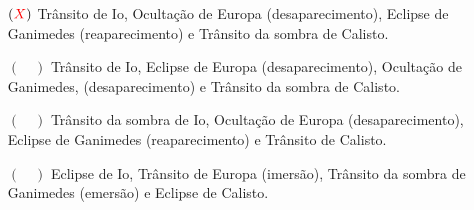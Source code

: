 \documentclass[a4paper, 12pt]{article}
\newcommand{\red}[1]{\textcolor{red}{#1}}
\begin{document}
\begin{flushleft}
\begin{itemize}
\begin{itemize}
                        \begin{itemize}
                            \item[$(\red{X})$] Trânsito de Io, Ocultação de Europa (desaparecimento), Eclipse de Ganimedes (reaparecimento) e Trânsito da sombra de Calisto.
                            \item[$(\quad)$] Trânsito de Io, Eclipse de Europa (desaparecimento), Ocultação de Ganimedes, (desaparecimento) e Trânsito da sombra de Calisto.
                            \item[$(\quad)$] Trânsito da sombra de Io, Ocultação de Europa (desaparecimento), Eclipse de Ganimedes (reaparecimento) e Trânsito de Calisto.
                            \item[$(\quad)$] Eclipse de Io, Trânsito de Europa (imersão), Trânsito da sombra de Ganimedes (emersão) e Eclipse de Calisto.
                        \end{itemize}
                \end{itemize}


\end{itemize}
\end{flushleft}
\end{document}
